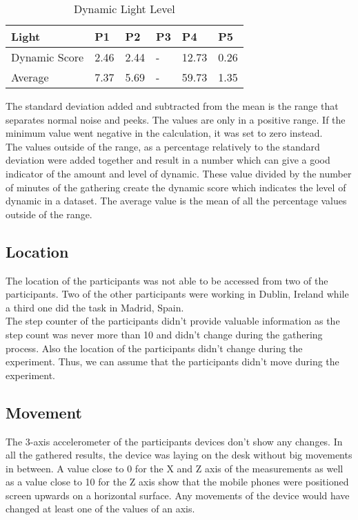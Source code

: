 \begin{table}[ht]
  \begin{tabular}{|P{3cm}|P{1.6cm}|P{1.6cm}|P{1.6cm}|P{1.6cm}|P{1.6cm}|}
   	\textbf{Light}				& \textbf{P1}			& \textbf{P2}			& 	\textbf{P3}		& 	\textbf{P4}			& 	\textbf{P5}	\\ \hline
  	Dynamic Score				& 2.46						& 2.44						& 	-						& 12.73					& 0.26				\\ \hline
  	Average 						& 7.37						& 5.69						& 	-						& 59.73					& 1.35				\\ \hline
  	\end{tabular}
  	\newline\newline
  	\caption{Dynamic Light Level}\label{dynLight}
\end{table}

The standard deviation added and subtracted from the mean is the range that separates normal noise and peeks. The values are only in a positive range. If the minimum value went negative in the calculation, it was set to zero instead.\\ 
The values outside of the range, as a percentage relatively to the standard deviation were added together and result in a number which can give a good indicator of the amount and level of dynamic. 
These value divided by the number of minutes of the gathering create the dynamic score which indicates the level of dynamic in a dataset.
The average value is the mean of all the percentage values outside of the range.

\FloatBarrier

\subsection{Location}
The location of the participants was not able to be accessed from two of the participants. Two of the other participants were working in Dublin, Ireland while a third one did the task in Madrid, Spain.\\
The step counter of the participants didn't provide valuable information as the step count was never more than 10 and didn't change during the gathering process. Also the location of the participants didn't change during the experiment. Thus, we can assume that the participants didn't move during the experiment.

\subsection{Movement}
The 3-axis accelerometer of the participants devices don't show any changes. In all the gathered results, the device was laying on the desk without big movements in between. A value close to 0 for the X and Z axis of the measurements as well as a value close to 10 for the Z axis show that the mobile phones were positioned screen upwards on a horizontal surface. Any movements of the device would have changed at least one of the values of an axis. 

